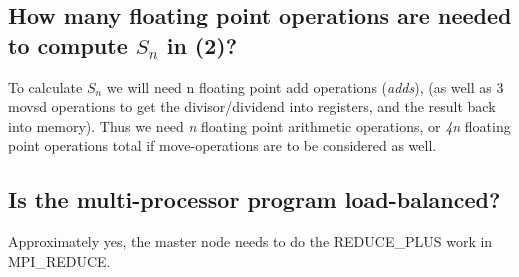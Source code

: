 \subsection{How many floating point operations are needed to compute $S_n$ in (2)?}
To calculate $S_n$ we will need n floating point add operations (\textit{adds}), (as well as 3 movsd operations to get the divisor/dividend
into registers, and the result back into memory). Thus we need \textit{n} floating point arithmetic operations, or \textit{4n} floating point
operations total if move-operations are to be considered as well.

\subsection{Is the multi-processor program load-balanced?}
Approximately yes, the master node needs to do the REDUCE_PLUS work in MPI_REDUCE.